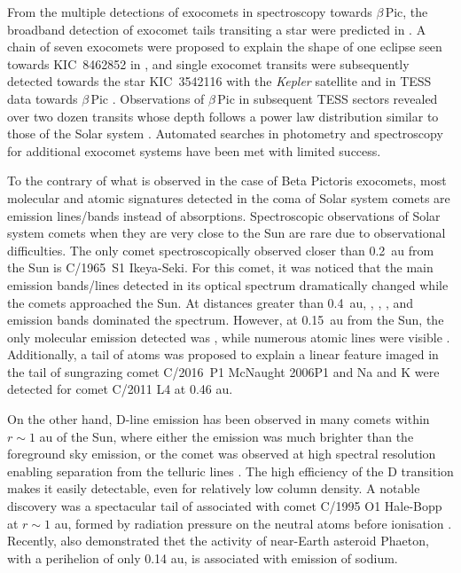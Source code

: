 \documentclass{aa}
\newcommand{\bp}{$\beta$\,Pic}
\begin{document}
From the multiple detections of exocomets in spectroscopy towards \bp{}, the broadband detection of exocomet tails transiting a star were predicted in \citet{1999A&A...343..916L}.
%
A chain of seven exocomets were proposed to explain the shape of one eclipse seen towards KIC~8462852 in \citet{Kiefer17}, and
single exocomet transits were subsequently detected towards the star KIC~3542116 \citep{Rappaport18} with the {\it Kepler} satellite \citep{Borucki10} and in TESS data towards \bp{} \citep{Zieba19}.
%
Observations of \bp{} in subsequent TESS sectors revealed over two dozen transits whose depth follows a power law distribution similar to those of the Solar system \citep{LecavelierdesEtangs22,Pavlenko22}.
%
Automated searches in photometry \citep{Kennedy19} and spectroscopy \citep{BendahanWest24} for additional exocomet systems have been met with limited success.

To the contrary of what is observed in the case of Beta Pictoris exocomets, most molecular and atomic signatures detected in the coma of Solar system comets are emission lines/bands instead of absorptions.
%
Spectroscopic observations of Solar system comets when they are very close to the Sun are rare due to observational difficulties.
%
The only comet spectroscopically observed closer than 0.2~au from the Sun is C/1965~S1 Ikeya-Seki.
%
For this comet, it was noticed that the main emission bands/lines detected in its optical spectrum dramatically changed while the comets approached the Sun.
%
At distances greater than 0.4~au, , , , and  emission bands dominated the spectrum.
%
However, at 0.15~au from the Sun, the only molecular emission detected was , while numerous atomic lines were visible \citep[, , , , , , , , , ; ][]{Dufay65,Thackeray1966,Preston1967,Slaughter1969}.
%
Additionally, a tail of  atoms was proposed to explain a linear feature imaged in the tail of sungrazing comet C/2016~P1 McNaught 2006P1 \citep{Fulle2007} and Na and K were detected for comet C/2011 L4 \citep{Fulle13} at 0.46 au. 

On the other hand,  D-line emission has been observed in many comets within $r \sim 1$ au of the Sun, where either the emission was much brighter than the foreground sky emission, or the comet was observed at high spectral resolution enabling separation from the telluric lines \citep{Cremonese02,Schmidt16}.
%
The high efficiency of the  D transition makes it easily detectable, even for relatively low column density.
%
A notable discovery was a spectacular tail of  associated with comet C/1995 O1 Hale-Bopp at $r\sim 1$ au, formed by radiation pressure on the neutral atoms before ionisation \citep{Cremonese1997}.
%
Recently, \cite{Hui2023} also demonstrated thet the activity of near-Earth asteroid Phaeton, with a perihelion of only 0.14 au, is associated with emission of sodium. 
\end{document}
